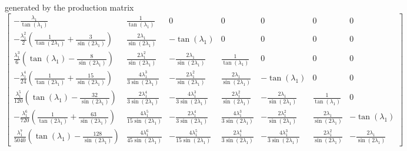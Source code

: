 generated by the production matrix
\begin{displaymath}
\left[\begin{matrix}- \frac{\lambda_{1}}{\tan{\left (\lambda_{1} \right )}} & \frac{1}{\tan{\left (\lambda_{1} \right )}} & 0 & 0 & 0 & 0 & 0\\- \frac{\lambda_{1}^{2}}{2} \left(\frac{1}{\tan{\left (2 \lambda_{1} \right )}} + \frac{3}{\sin{\left (2 \lambda_{1} \right )}}\right) & \frac{2 \lambda_{1}}{\sin{\left (2 \lambda_{1} \right )}} & - \tan{\left (\lambda_{1} \right )} & 0 & 0 & 0 & 0\\\frac{\lambda_{1}^{3}}{6} \left(\tan{\left (\lambda_{1} \right )} - \frac{8}{\sin{\left (2 \lambda_{1} \right )}}\right) & \frac{2 \lambda_{1}^{2}}{\sin{\left (2 \lambda_{1} \right )}} & - \frac{2 \lambda_{1}}{\sin{\left (2 \lambda_{1} \right )}} & \frac{1}{\tan{\left (\lambda_{1} \right )}} & 0 & 0 & 0\\- \frac{\lambda_{1}^{4}}{24} \left(\frac{1}{\tan{\left (2 \lambda_{1} \right )}} + \frac{15}{\sin{\left (2 \lambda_{1} \right )}}\right) & \frac{4 \lambda_{1}^{3}}{3 \sin{\left (2 \lambda_{1} \right )}} & - \frac{2 \lambda_{1}^{2}}{\sin{\left (2 \lambda_{1} \right )}} & \frac{2 \lambda_{1}}{\sin{\left (2 \lambda_{1} \right )}} & - \tan{\left (\lambda_{1} \right )} & 0 & 0\\\frac{\lambda_{1}^{5}}{120} \left(\tan{\left (\lambda_{1} \right )} - \frac{32}{\sin{\left (2 \lambda_{1} \right )}}\right) & \frac{2 \lambda_{1}^{4}}{3 \sin{\left (2 \lambda_{1} \right )}} & - \frac{4 \lambda_{1}^{3}}{3 \sin{\left (2 \lambda_{1} \right )}} & \frac{2 \lambda_{1}^{2}}{\sin{\left (2 \lambda_{1} \right )}} & - \frac{2 \lambda_{1}}{\sin{\left (2 \lambda_{1} \right )}} & \frac{1}{\tan{\left (\lambda_{1} \right )}} & 0\\- \frac{\lambda_{1}^{6}}{720} \left(\frac{1}{\tan{\left (2 \lambda_{1} \right )}} + \frac{63}{\sin{\left (2 \lambda_{1} \right )}}\right) & \frac{4 \lambda_{1}^{5}}{15 \sin{\left (2 \lambda_{1} \right )}} & - \frac{2 \lambda_{1}^{4}}{3 \sin{\left (2 \lambda_{1} \right )}} & \frac{4 \lambda_{1}^{3}}{3 \sin{\left (2 \lambda_{1} \right )}} & - \frac{2 \lambda_{1}^{2}}{\sin{\left (2 \lambda_{1} \right )}} & \frac{2 \lambda_{1}}{\sin{\left (2 \lambda_{1} \right )}} & - \tan{\left (\lambda_{1} \right )}\\\frac{\lambda_{1}^{7}}{5040} \left(\tan{\left (\lambda_{1} \right )} - \frac{128}{\sin{\left (2 \lambda_{1} \right )}}\right) & \frac{4 \lambda_{1}^{6}}{45 \sin{\left (2 \lambda_{1} \right )}} & - \frac{4 \lambda_{1}^{5}}{15 \sin{\left (2 \lambda_{1} \right )}} & \frac{2 \lambda_{1}^{4}}{3 \sin{\left (2 \lambda_{1} \right )}} & - \frac{4 \lambda_{1}^{3}}{3 \sin{\left (2 \lambda_{1} \right )}} & \frac{2 \lambda_{1}^{2}}{\sin{\left (2 \lambda_{1} \right )}} & - \frac{2 \lambda_{1}}{\sin{\left (2 \lambda_{1} \right )}}\end{matrix}\right]
\end{displaymath}
